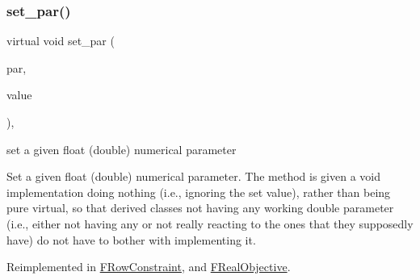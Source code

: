\mbox{\label{class_s_m_spp__di__unipi__it_1_1_thin_compute_interface_a602be88195984f4f1b5dff7995976530}} 
\subsubsection{\texorpdfstring{set\+\_\+par()}{set\_par()}\hspace{0.1cm}{\footnotesize\ttfamily [2/3]}}
{\footnotesize\ttfamily virtual void set\+\_\+par (\begin{DoxyParamCaption}\item[{const \mbox{\hyperlink{class_s_m_spp__di__unipi__it_1_1_thin_compute_interface_aa3d710629ad8c434286726ad810c3b47}{idx\+\_\+type}}}]{par,  }\item[{const double}]{value }\end{DoxyParamCaption})\hspace{0.3cm}{\ttfamily [inline]}, {\ttfamily [virtual]}}



set a given float (double) numerical parameter 

Set a given float (double) numerical parameter. The method is given a void implementation doing nothing (i.\+e., ignoring the set value), rather than being pure virtual, so that derived classes not having any working double parameter (i.\+e., either not having any or not really reacting to the ones that they supposedly have) do not have to bother with implementing it. 

Reimplemented in \mbox{\hyperlink{class_s_m_spp__di__unipi__it_1_1_f_row_constraint_a341557f3dd81bff0f060dbe41a4ba325}{F\+Row\+Constraint}}, and \mbox{\hyperlink{class_s_m_spp__di__unipi__it_1_1_f_real_objective_a341557f3dd81bff0f060dbe41a4ba325}{F\+Real\+Objective}}.

\mbox{\label{class_s_m_spp__di__unipi__it_1_1_thin_compute_interface_acefe0a2a66d64babff1331eba9cac34d}} 
